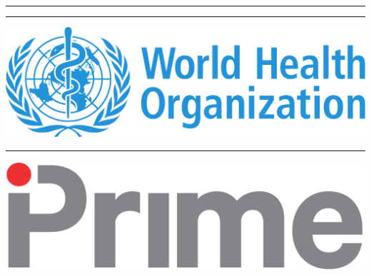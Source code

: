 \begin{titlepage}

\hspace*{-1cm}\begin{minipage}[t][0.1\textheight]{5cm}
\textcolor{whoblue!15}{\rule{5cm}{0.1\textheight}}
\end{minipage}
\hspace*{1cm}\begin{minipage}[t]{10cm}
\textcolor{whoblue}{\rule{10cm}{0.5mm}}
\end{minipage}

\hspace*{-1cm}\begin{minipage}[t][0.1\textheight]{5cm}
\vspace{0pt}
\includegraphics[height=0.1\textheight]{./figure/logo_who}\\[0.55cm]
\textcolor{whoblue!15}{\rule{5cm}{0.1\textheight}}
\end{minipage}
\hspace*{1cm}\begin{minipage}[t][0.2\textheight]{10cm}{}
\vspace{0pt}
\begin{flushright}
\begin{spacing}{2.0}
\end{spacing}
\end{flushright}
\end{minipage}

\hspace*{-1cm}\begin{minipage}[0.1\textheight]{5cm}
\vspace{0pt}
\includegraphics[height=0.1\textheight]{./figure/logo_prime}
\end{minipage}
\hspace*{1cm}\begin{minipage}{10cm}
\vspace{0pt}
\begin{flushright}
\begin{spacing}{1.0}
\end{spacing}
\end{flushright}
\end{minipage}


\end{titlepage}
